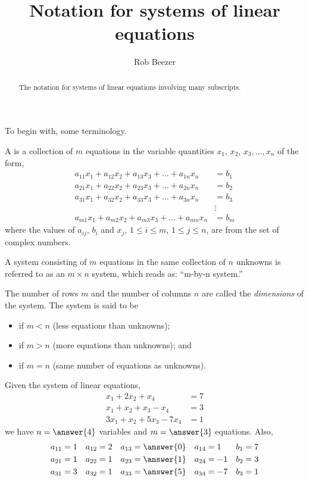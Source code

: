 \documentclass{ximera}
\author{Rob Beezer}
\title{Notation for systems of linear equations}
\begin{document}
\begin{abstract}
  The notation for systems of linear equations involving many subscripts.
\end{abstract}
\maketitle

To begin with, some terminology. 

\begin{definition}
  A  is a collection of $m$ equations
  in the variable quantities $x_1,\,x_2,\,x_3,\ldots,x_n$ of the form,
  \begin{align*}
    a_{11}x_1+a_{12}x_2+a_{13}x_3+\dots+a_{1n}x_n&=b_1\\
    a_{21}x_1+a_{22}x_2+a_{23}x_3+\dots+a_{2n}x_n&=b_2\\
    a_{31}x_1+a_{32}x_2+a_{33}x_3+\dots+a_{3n}x_n&=b_3\\
                                                 &\vdots\\
    a_{m1}x_1+a_{m2}x_2+a_{m3}x_3+\dots+a_{mn}x_n&=b_m
  \end{align*}
  where the values of $a_{ij}$, $b_i$ and $x_j$, $1\leq i\leq m$,
  $1\leq j\leq n$, are from the set of complex numbers.

  A system consisting of $m$ equations in the same collection of $n$
  unknowns is referred to as an $m\times n$ system, which reads as:
  ``m-by-n system.''
\end{definition}

The number of rows $m$ and the number of columns $n$ are called the {\it dimensions} of the system. The system is said to be
\begin{itemize}
\item {} if $m < n$ (less equations than unknowns);
\item {} if $m > n$ (more equations than unknowns); and
\item {} if $m = n$ (same number of equations as unknowns).
\end{itemize}

\begin{example}
  Given the system of linear equations,
  \begin{align*}
    x_1+2x_2 + x_4&= 7\\
    x_1+x_2+x_3-x_4&=3\\
    3x_1+x_2+5x_3-7x_4&=1
  \end{align*}
  we have $n=\answer{4}$ variables and $m=\answer{3}$ equations.  Also,
  \begin{align*}
    a_{11}&=1 & a_{12}&=2 & a_{13}&=\answer{0} & a_{14}&=1 & b_{1}&=7\\
    a_{21}&=1 & a_{22}&=1 & a_{23}&=\answer{1} & a_{24}&=-1 & b_{2}&=3\\
    a_{31}&=3 & a_{32}&=1 & a_{33}&=\answer{5} & a_{34}&=-7 & b_{3}&=1
  \end{align*}
\end{example}
\end{document}
